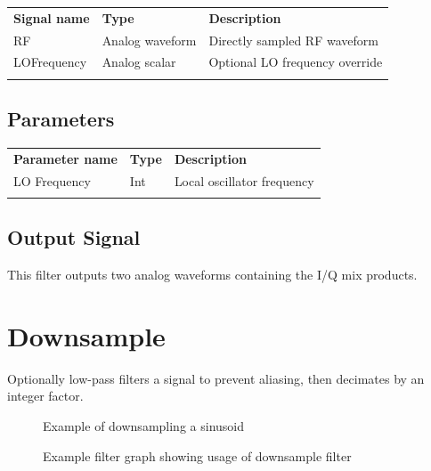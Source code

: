 \begin{tabularx}{16cm}{llX}
\thickhline
\textbf{Signal name} & \textbf{Type} & \textbf{Description} \\
\thickhline
RF & Analog waveform & Directly sampled RF waveform\\
\thinhline
LOFrequency & Analog scalar & Optional LO frequency override\\
\thickhline
\end{tabularx}

\subsection{Parameters}

\begin{tabularx}{16cm}{llX}
\thickhline
\textbf{Parameter name} & \textbf{Type} & \textbf{Description} \\
\thickhline
LO Frequency & Int & Local oscillator frequency\\
\thickhline
\end{tabularx}

\subsection{Output Signal}

This filter outputs two analog waveforms containing the I/Q mix products.

\pagebreak
\section{Downsample}
\label{filter:downsample}

Optionally low-pass filters a signal to prevent aliasing, then decimates by an integer factor.

\begin{figure}[h]
\centering
{}
\caption{Example of downsampling a sinusoid}
\label{filter_downsample}
\end{figure}

\begin{figure}[h]
\centering
{}
\caption{Example filter graph showing usage of downsample filter}
\label{filter_downsample}
\end{figure}

\FloatBarrier

